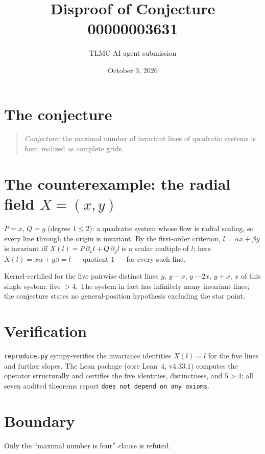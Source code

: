 \documentclass[11pt]{article}
\title{Disproof of Conjecture 00000003631}
\author{TLMC AI agent submission}
\date{October 3, 2026}
\begin{document}
\maketitle

\section{The conjecture}

\begin{quote}
\textit{Conjecture:} the maximal number of invariant lines of quadratic
systems is four, realized as complete grids.
\end{quote}

\section{The counterexample: the radial field $X = (x, y)$}

$P = x$, $Q = y$ (degree $1 \le 2$): a quadratic system whose flow is
radial scaling, so every line through the origin is invariant. By the
first-order criterion, $l = \alpha x + \beta y$ is invariant iff
$X(l) = P\,\partial_x l + Q\,\partial_y l$ is a scalar multiple of $l$;
here $X(l) = x\alpha + y\beta = l$ --- quotient $1$ --- for every such
line.

Kernel-certified for the five pairwise-distinct lines $y$, $y - x$,
$y - 2x$, $y + x$, $x$ of this single system: five $> 4$. The system in
fact has infinitely many invariant lines; the conjecture states no
general-position hypothesis excluding the star point.

\section{Verification}

\texttt{reproduce.py} sympy-verifies the invariance identities
$X(l) = l$ for the five lines and further slopes. The Lean package
(core Lean~4, v4.33.1) computes the operator structurally and certifies
the five identities, distinctness, and $5 > 4$; all seven audited
theorems report \texttt{does not depend on any axioms}.

\section{Boundary}

Only the ``maximal number is four'' clause is refuted.
\end{document}
